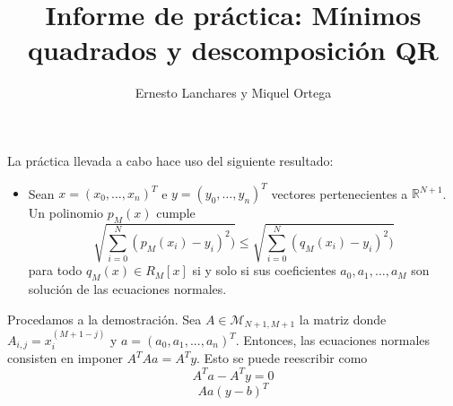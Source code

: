\documentclass[12pt]{article}
\begin{document}
\title{Informe de práctica: Mínimos quadrados y descomposición QR}
\author{Ernesto Lanchares y Miquel Ortega}
\date{}
\maketitle

\setlength\parindent{0pt}

La práctica llevada a cabo hace uso del siguiente resultado:


\begin{itemize}
\item 
Sean $x = (x_0,\dots,x_n)^T$ e $y = (y_0,\dots,y_n)^T$ vectores pertenecientes a $\mathbb{R}^{N+1}$. Un polinomio $p_M(x)$ cumple
\begin{equation}\label{eq:1}
\sqrt{\sum_{i=0}^{N} (p_M(x_i) - y_i)^2)} 
\leq \sqrt{\sum_{i=0}^{N} (q_M(x_i) - y_i)^2)}
\end{equation}
para todo $q_M(x) \in R_M[x]$ si y solo si sus coeficientes $a_0, a_1,\dots,a_M$ son solución de las ecuaciones normales.
\end{itemize}

Procedamos a la demostración. Sea $A\in\mathcal{M}_{N+1, M+1}$ la matriz donde $A_{i,j} = x_i^{(M+1-j)}$ y $a = (a_0, a_1,...,a_n)^T$. Entonces, las ecuaciones normales consisten en imponer $A^TAa = A^Ty$. Esto se puede reescribir como 
\[A^Ta-A^Ty = 0\]
\[Aa(y-b)^T\]
\end{document}
